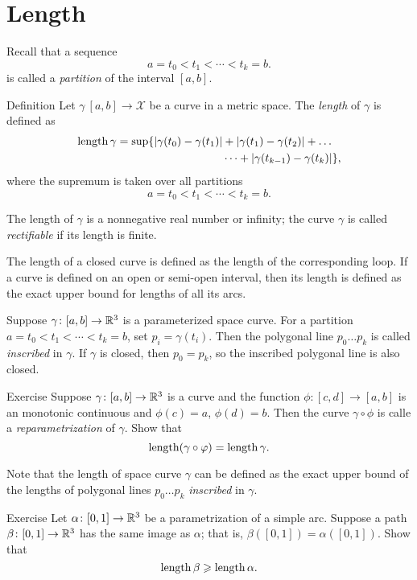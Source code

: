 \chapter{Length}
 
Recall that a sequence 
\[a=t_0 < t_1 < \cdots < t_k=b.\]
is called a \emph{partition} of the interval $[a,b]$.

\begin{thm}{Definition}\label{def:length}
Let $\gamma\:[a,b]\to \mathcal{X}$ be a curve in a metric space.
The \emph{length} of $\gamma$ is defined as
\begin{align*}
\mathop{\rm length}\nolimits \gamma
= 
\sup \{|\gamma(t_0)-\gamma(t_1)|&+|\gamma(t_1)-\gamma(t_2)|+\dots
\\
&\dots+|\gamma(t_{k-1})-\gamma(t_k)|\},
\end{align*}
where the supremum is taken over all partitions
\[a=t_0 < t_1 < \cdots < t_k=b.\]

The length of $\gamma$ is a nonnegative real number or infinity;
the curve $\gamma$ is called \emph{rectifiable} if its length is finite. 

The length of a closed curve is defined as the length of the corresponding loop.
If a curve is defined on an open or semi-open interval, then its length is defined as the exact upper bound for lengths of all its arcs.
\end{thm}

Suppose $\gamma\colon[a,b]\to \mathbb{R}^3$ is a parameterized space curve.
For a partition $a=t_0 < t_1 < \cdots < t_k=b$, set $p_i=\gamma(t_i)$.
Then the polygonal line $p_0\dots p_k$ is called \emph{inscribed} in $\gamma$.
If $\gamma$ is closed, then $p_0=p_k$, so the inscribed polygonal line is also closed.

\begin{thm}{Exercise}\label{ex:integral-length-0}
Suppose $\gamma\colon[a,b] \to\mathbb{R}^3$ is a curve and the function $\phi : [c,d] \to [a,b]$ is an monotonic continuous and $\phi(c)=a$, $\phi(d)=b$.
Then the curve $\gamma \circ \phi$ is calle a 
\emph{reparametrization} of $\gamma$.
Show that 
\[\mathop{\rm length}\nolimits (\gamma \circ \varphi) = \mathop{\rm length}\nolimits \gamma.\]

\end{thm}

Note that the length of space curve $\gamma$ can be defined as the exact upper bound of the lengths of polygonal lines $p_0\dots p_k$ \emph{inscribed} in $\gamma$.

\begin{thm}{Exercise}\label{ex:length-image}
Let $\alpha\colon[0,1]\to\mathbb{R}^3$ be a parametrization of a simple arc.
Suppose a path $\beta\colon[0,1]\to\mathbb{R}^3$ has the same image as $\alpha$;
that is, $\beta([0,1])=\alpha([0,1])$.
Show that 
\[\mathop{\rm length}\nolimits \beta\geqslant \mathop{\rm length}\nolimits \alpha.\]

\end{thm}

